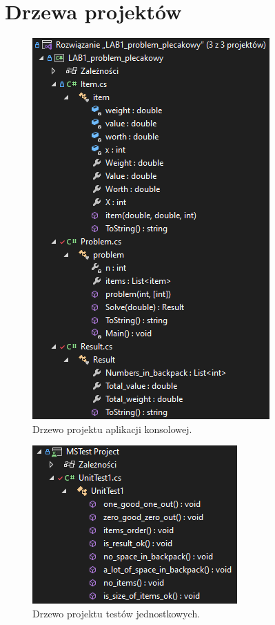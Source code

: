 \documentclass{report}
\begin{document}
\chapter{Drzewa projektów}

\begin{figure}[H]%
	\centering
	\includegraphics[scale=0.6]{zdj/cmd_drzewo}
	\caption{Drzewo projektu aplikacji konsolowej.}
\end{figure}

\begin{figure}[H]%
	\centering
	\includegraphics[scale=0.6]{zdj/testy_drzewo}
	\caption{Drzewo projektu testów jednostkowych.}
\end{figure}
\end{document}
